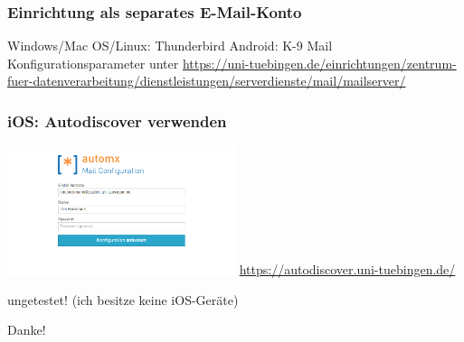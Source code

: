 \documentclass[glossy,aspectratio=169]{beamer}
\begin{document}
	\begin{frame}
	\frametitle{Einrichtung als separates E-Mail-Konto}
	\begin{exampleblock}{Windows/Mac OS/Linux: Thunderbird \quad Android: K-9 Mail}
		Konfigurationsparameter unter \url{https://uni-tuebingen.de/einrichtungen/zentrum-fuer-datenverarbeitung/dienstleistungen/serverdienste/mail/mailserver/}
	\end{exampleblock}
	\end{frame}

	\begin{frame}
	\frametitle{iOS: Autodiscover verwenden}
		\centering
		\includegraphics[width=0.5\textwidth]{pictures/autodiscover.png}
		\url{https://autodiscover.uni-tuebingen.de/}
		\begin{alertblock}{ungetestet!}
			(ich besitze keine iOS-Geräte)
		\end{alertblock}
	\end{frame}

	\begin{frame}
		\centering
		\Huge Danke!
	\end{frame}
\end{document}
